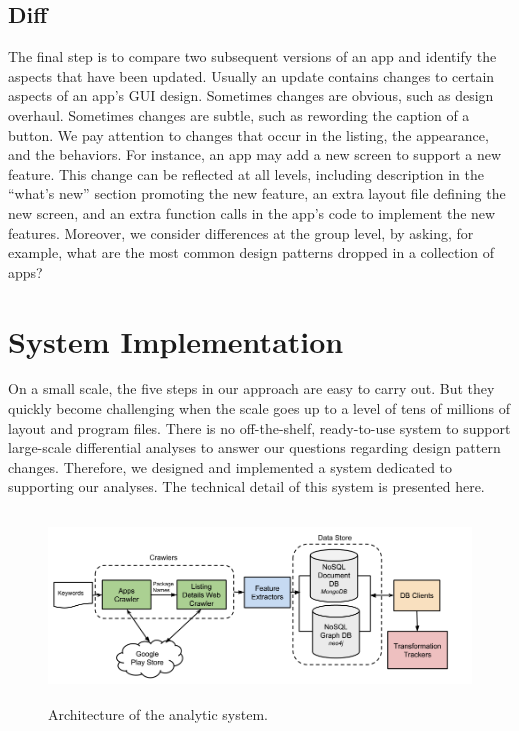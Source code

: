 \subsection{Diff}
The final step is to compare two subsequent versions of an app and identify the aspects that have been updated.
Usually an update contains changes to certain aspects of an app's GUI design. Sometimes changes are obvious, such as design overhaul.
Sometimes changes are subtle, such as rewording the caption of a button. We pay attention to changes that occur in the listing, the appearance, and the behaviors.
For instance, an app may add a new screen to support a new feature.
This change can be reflected at all levels, including description in the ``what's new'' section promoting the new feature, an extra layout file defining the new screen, and an extra function calls in the app's code to implement the new features.
Moreover, we consider differences at the group level, by asking, for example, what are the most common design patterns dropped in a collection of apps?

\section{System Implementation}

On a small scale, the five steps in our approach are easy to carry out.
But they quickly become challenging when the scale goes up to a level of tens of millions of layout and program files.
There is no off-the-shelf, ready-to-use system to support large-scale differential analyses to answer our questions regarding design pattern changes.
Therefore, we designed and implemented a system dedicated to supporting our analyses. The technical detail of this system is presented here.

\begin{figure}[!t]
	\centering
	\includegraphics[width=16cm, height=5cm]{figures/design-pattern-changes/system_architecture}
	\caption{Architecture of the analytic system.}
	\label{fig:fig_system_architecture}
\end{figure}


